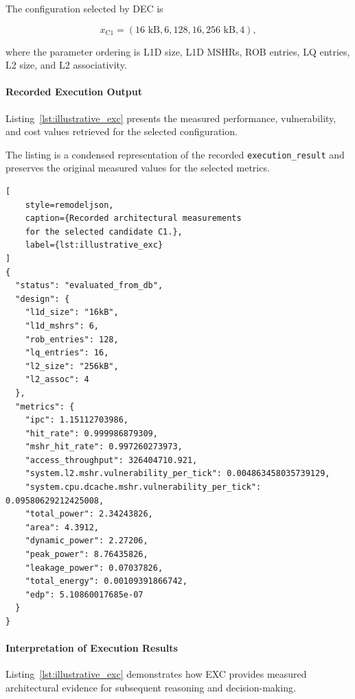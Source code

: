 The configuration selected by DEC is

\begin{equation}
x_{\mathrm{C1}} =
(
16\text{ kB},
6,
128,
16,
256\text{ kB},
4
),
\label{eq:illustrative_exc_design}
\end{equation}

where the parameter ordering is L1D size,
L1D MSHRs, ROB entries, LQ entries,
L2 size, and L2 associativity.

\paragraph{Recorded Execution Output}

Listing~\ref{lst:illustrative_exc}
presents the measured performance,
vulnerability, and cost values retrieved
for the selected configuration.

The listing is a condensed representation
of the recorded \texttt{execution\_result}
and preserves the original measured values
for the selected metrics.

\begin{lstlisting}[
    style=remodeljson,
    caption={Recorded architectural measurements
    for the selected candidate C1.},
    label={lst:illustrative_exc}
]
{
  "status": "evaluated_from_db",
  "design": {
    "l1d_size": "16kB",
    "l1d_mshrs": 6,
    "rob_entries": 128,
    "lq_entries": 16,
    "l2_size": "256kB",
    "l2_assoc": 4
  },
  "metrics": {
    "ipc": 1.15112703986,
    "hit_rate": 0.999986879309,
    "mshr_hit_rate": 0.997260273973,
    "access_throughput": 326404710.921,
    "system.l2.mshr.vulnerability_per_tick": 0.004863458035739129,
    "system.cpu.dcache.mshr.vulnerability_per_tick": 0.09580629212425008,
    "total_power": 2.34243826,
    "area": 4.3912,
    "dynamic_power": 2.27206,
    "peak_power": 8.76435826,
    "leakage_power": 0.07037826,
    "total_energy": 0.00109391866742,
    "edp": 5.10860017685e-07
  }
}
\end{lstlisting}

\paragraph{Interpretation of Execution Results}

Listing~\ref{lst:illustrative_exc}
demonstrates how EXC provides measured
architectural evidence for subsequent
reasoning and decision-making.

